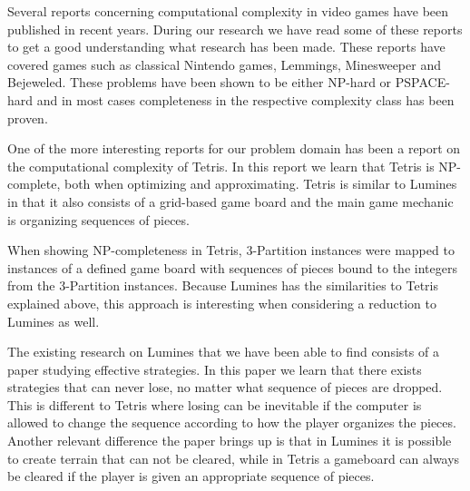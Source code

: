 Several reports concerning computational complexity in video games have been published in recent years. During our research we have read some of these reports to get a good understanding what research has been made. These reports have covered games such as classical Nintendo games\cite{classic}, Lemmings\cite{lemmings}, Minesweeper\cite{minesweeper} and Bejeweled\cite{candy}. These problems have been shown to be either NP-hard or PSPACE-hard and in most cases completeness in the respective complexity class has been proven.

One of the more interesting reports for our problem domain has been a report on the computational complexity of Tetris. In this report we learn that Tetris is NP-complete,  both when optimizing and approximating. Tetris is similar to Lumines in that it also consists of a grid-based game board and the main game mechanic is organizing sequences of pieces.

When showing NP-completeness in Tetris, 3-Partition instances were mapped to instances of a defined game board with sequences of pieces bound to the integers from the 3-Partition instances. Because Lumines has the similarities to Tetris explained above, this approach is interesting when considering a reduction to Lumines as well.

The existing research on Lumines that we have been able to find consists of a paper studying effective strategies. In this paper we learn that there exists strategies that can never lose, no matter what sequence of pieces are dropped. This is different to Tetris where losing can be inevitable if the computer is allowed to change the sequence according to how the player organizes the pieces. Another relevant difference the paper brings up is that in Lumines it is possible to create terrain that can not be cleared, while in Tetris a gameboard can always be cleared if the player is given an appropriate sequence of pieces.
